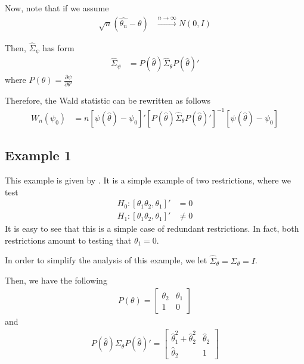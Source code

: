 \documentclass[11pt]{article}\usepackage[]{graphicx}\usepackage[]{color}
\begin{document}
Now, note that if we assume
\begin{align}
	\sqrt{n} ( \hat{\theta_n}- \theta ) & \xrightarrow{n \rightarrow \infty} N(0,I)
\end{align}

Then, $\hat{\Sigma}_\psi$ has form
\begin{align}
	\hat{\Sigma}_\psi & = P(\hat{\theta}) \hat{\Sigma}_\theta P(\hat{\theta})'
\end{align}
where $P(\theta)=\frac{\partial \psi}{\partial \theta'}$

Therefore, the Wald statistic can be rewritten as follows
\begin{align}
	W_n(\psi_0) & = n \left[\psi (\hat{\theta}) - \psi_0\right]' \left[ P(\hat{\theta}) \hat{\Sigma}_\theta P(\hat{\theta})' \right]^{-1} \left[\psi (\hat{\theta}) - \psi_0\right]
\end{align}

\subsection{Example 1}

This example is given by \cite{dufour_rank-robust_2016}. It is a simple example of two restrictions, where we test
\begin{align}
	H_0: [\theta_1 \theta_2 , \theta_1]' & = 0 \\
	H_1: [\theta_1 \theta_2 , \theta_1]'  & \neq 0
\end{align}
It is easy to see that this is a simple case of redundant restrictions. In fact, both restrictions amount to testing that $\theta_1=0$.

In order to simplify the analysis of this example, we let $\hat{\Sigma}_\theta=\Sigma_\theta=I$.

Then, we have the following
\begin{align}
	P(\theta) = \left[\begin{array}{cc}
		\theta_2 & \theta_1 \\
		1 & 0
	\end{array}\right]
\end{align}
and
\begin{align}
	P(\hat{\theta})\Sigma_\theta P(\hat{\theta})' = \left[\begin{array}{cc}
		\hat{\theta}_1^2 + \hat{\theta}_2^2 & \hat{\theta}_2 \\
		\hat{\theta}_2 & 1
	\end{array}\right]
\end{align}
\end{document}
